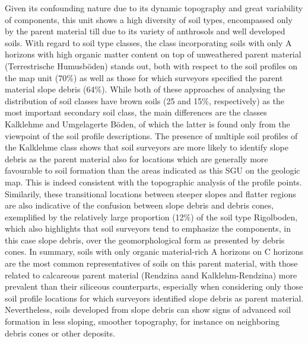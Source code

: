 \documentclass[preprint,12pt,authoryear]{elsarticle}
\begin{document}
Given its confounding nature due to its dynamic topography and  great variability of components, this unit shows a high diversity of soil types, encompassed only by the parent material till due to its variety of anthrosols and well developed soils.  With regard to soil type classes, the class incorporating soils with only A horizons with high organic matter content on top of unweathered parent material (Terrestrische Humusb\"oden) stands out, both with respect to the soil profiles on the map unit (70\%) as well as those for which surveyors specified the parent material slope debris (64\%). While both of these approaches of analysing the distribution of soil classes have brown soils (25 and 15\%, respectively) as the most important secondary soil class, the main differences are the classes Kalklehme and Umgelagerte B\"oden, of which the latter is found only from the viewpoint of the soil profile descriptions. The presence of multiple soil profiles of the Kalklehme class shows that soil surveyors are more likely to identify slope debris as the parent material also for locations which are generally more favourable to soil formation than the areas indicated as this SGU on the geologic map. This is indeed consistent with the topographic analysis of the profile points. Similarily, these transitional locations between steeper slopes and flatter regions are also indicative of the confusion between slope debris and debris cones, exemplified by the relatively large proportion (12\%) of the soil type Rigolboden, which also highlights that soil surveyors tend to emphasize the components, in this case slope debris, over the geomorphological form as presented by debris cones. In summary, soils with only organic material-rich A horizons on C horizons are the most common representatives of soils on this parent material, with those related to calcareous parent material (Rendzina aand Kalklehm-Rendzina) more prevalent than their siliceous counterparts, especially when considering only those soil profile locations for which surveyors identified slope debris as parent material. Nevertheless, soils developed from slope debris can show signs of advanced soil formation in less sloping, smoother topography, for instance on neighboring debris cones or other deposits. 
\end{document}
